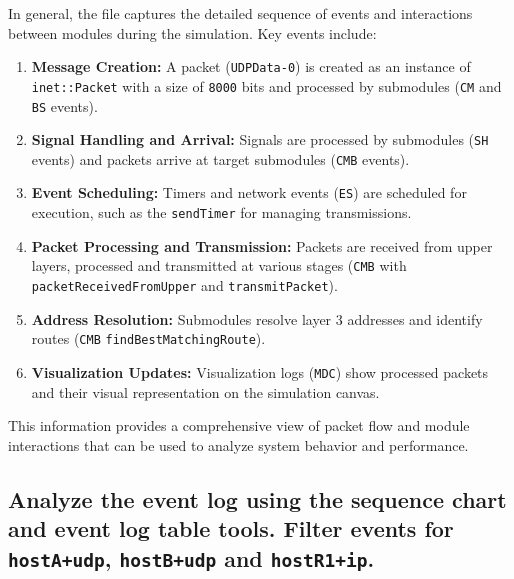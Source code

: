 \documentclass[
  letterpaper,
  DIV=11,
  numbers=noendperiod]{scrartcl}
\providecommand{\tightlist}{%
  \setlength{\itemsep}{0pt}\setlength{\parskip}{0pt}}\usepackage{longtable,booktabs,array}
\begin{document}
In general, the file captures the detailed sequence of events and
interactions between modules during the simulation. Key events include:

\begin{enumerate}
\def\labelenumi{\arabic{enumi}.}
\tightlist
\item
  \textbf{Message Creation:} A packet (\texttt{UDPData-0}) is created as
  an instance of \texttt{inet::Packet} with a size of \texttt{8000} bits
  and processed by submodules (\texttt{CM} and \texttt{BS} events).
\item
  \textbf{Signal Handling and Arrival:} Signals are processed by
  submodules (\texttt{SH} events) and packets arrive at target
  submodules (\texttt{CMB} events).
\item
  \textbf{Event Scheduling:} Timers and network events (\texttt{ES}) are
  scheduled for execution, such as the \texttt{sendTimer} for managing
  transmissions.
\item
  \textbf{Packet Processing and Transmission:} Packets are received from
  upper layers, processed and transmitted at various stages
  (\texttt{CMB} with \texttt{packetReceivedFromUpper} and
  \texttt{transmitPacket}).
\item
  \textbf{Address Resolution:} Submodules resolve layer 3 addresses and
  identify routes (\texttt{CMB} \texttt{findBestMatchingRoute}).
\item
  \textbf{Visualization Updates:} Visualization logs (\texttt{MDC}) show
  processed packets and their visual representation on the simulation
  canvas.
\end{enumerate}

This information provides a comprehensive view of packet flow and module
interactions that can be used to analyze system behavior and
performance.

\subsection{\texorpdfstring{Analyze the event log using the sequence
chart and event log table tools. Filter events for \texttt{hostA+udp},
\texttt{hostB+udp} and
\texttt{hostR1+ip}.}{Analyze the event log using the sequence chart and event log table tools. Filter events for hostA+udp, hostB+udp and hostR1+ip.}}\label{analyze-the-event-log-using-the-sequence-chart-and-event-log-table-tools.-filter-events-for-hostaudp-hostbudp-and-hostr1ip.}
\end{document}
